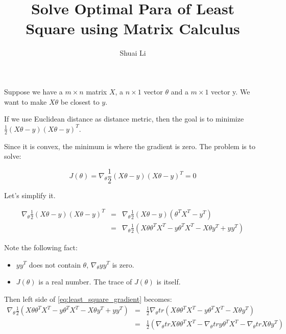 \documentclass[a4paper]{article}
\title{Solve Optimal Para of Least Square using Matrix Calculus}
\author{Shuai Li}
\newenvironment{definition}[1][Definition]{\begin{trivlist}
\item[\hskip \labelsep {\bfseries #1}]}{\end{trivlist}}
\begin{document}
\maketitle

\begin{definition}
	Suppose we have a $m\times n$ matrix $X$, a $n\times 1$ vector
	$\theta$ and a $m\times 1$ vector y. We want to make
	$X\theta$ be closest to $y$.
\end{definition}

If we use Euclidean distance as distance metric, then the goal is to
minimize $\frac{1}{2}(X\theta - y)(X\theta - y)^T$.

Since it is convex, the minimum is where the gradient is zero. The
problem is to solve:

\begin{equation}
	J(\theta) = \nabla_\theta \frac{1}{2}(X\theta - y)(X\theta - y)^T = 0
	\label{eq:least_square_gradient}
\end{equation}

Let's simplify it.

\begin{eqnarray}
	\nabla_\theta \frac{1}{2}(X\theta - y)(X\theta - y)^T &=& \nabla_\theta \frac{1}{2}(X\theta - y)(\theta^TX^T - y^T) \nonumber\\
		&=& \nabla_\theta \frac{1}{2}(X\theta \theta^TX^T - y\theta^TX^T - X\theta y^T + yy^T) \nonumber
\end{eqnarray}

Note the following fact:
\begin{itemize}
	\item $yy^T$ does not contain $\theta$, $\nabla_\theta yy^T$ is zero.
	\item $J(\theta)$ is a real number. The trace of $J(\theta)$ is itself.
\end{itemize}

Then left side of \cref{eq:least_square_gradient} becomes:
\begin{eqnarray}
		\nabla_\theta \frac{1}{2}(X\theta \theta^TX^T - y\theta^TX^T - X\theta y^T + yy^T) &=& \frac{1}{2}\nabla_\theta tr(X\theta \theta^TX^T - y\theta^TX^T - X\theta y^T)\nonumber\\
	&=& \frac{1}{2}(\nabla_\theta trX\theta\theta^T X^T - \nabla_\theta try\theta^TX^T - \nabla_\theta trX\theta y^T)
\end{eqnarray}
\end{document}
